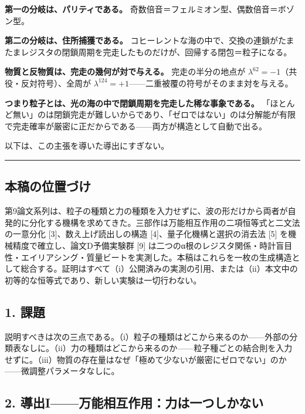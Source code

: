 \documentclass[
  a4paper,
]{ltjsarticle}
\begin{document}
\textbf{第一の分岐は、パリティである。}
奇数倍音＝フェルミオン型、偶数倍音＝ボゾン型。

\textbf{第二の分岐は、住所捕獲である。}
コヒーレントな海の中で、交換の連鎖がたまたまレジスタの閉鎖周期を完走したものだけが、回帰する閉包＝粒子になる。

\textbf{物質と反物質は、完走の幾何が対で与える。} 完走の半分の地点が
\(\lambda^{62}=-1\)（共役・反対符号）、全周が
\(\lambda^{124}=+1\)------二重被覆の符号がそのまま対を与える。

\textbf{つまり粒子とは、光の海の中で閉鎖周期を完走した稀な事象である。}
「ほとんど無い」のは閉鎖完走が難しいからであり、「ゼロではない」のは分解能が有限で完走確率が厳密に正だからである------両方が構造として自動で出る。

以下は、この主張を導いた導出にすぎない。

\begin{center}\rule{0.5\linewidth}{0.5pt}\end{center}

\subsection{本稿の位置づけ}\label{ux672cux7a3fux306eux4f4dux7f6eux3065ux3051}

第9論文系列は、粒子の種類と力の種類を入力せずに、波の形だけから両者が自発的に分化する機構を求めてきた。三部作は万能相互作用の二項恒等式と二文法の一意分化
{[}3{]}、数え上げ読出しの構造 {[}4{]}、量子化機構と選択の消去法 {[}5{]}
を機械精度で確立し、論文D予備実験群 {[}9{]}
は二つのα根のレジスタ関係・時計盲目性・エイリアシング・質量ビートを実測した。本稿はこれらを一枚の生成構造として総合する。証明はすべて（i）公開済みの実測の引用、または（ii）本文中の初等的な恒等式であり、新しい実験は一切行わない。

\subsection{1. 課題}\label{ux8ab2ux984c}

説明すべきは次の三点である。（i）粒子の種類はどこから来るのか------外部の分類表なしに。（ii）力の種類はどこから来るのか------粒子種ごとの結合則を入力せずに。（iii）物質の存在量はなぜ「極めて少ないが厳密にゼロでない」のか------微調整パラメータなしに。

\subsection{2.
導出I------万能相互作用：力は一つしかない}\label{ux5c0eux51faiux4e07ux80fdux76f8ux4e92ux4f5cux7528ux529bux306fux4e00ux3064ux3057ux304bux306aux3044}
\end{document}
